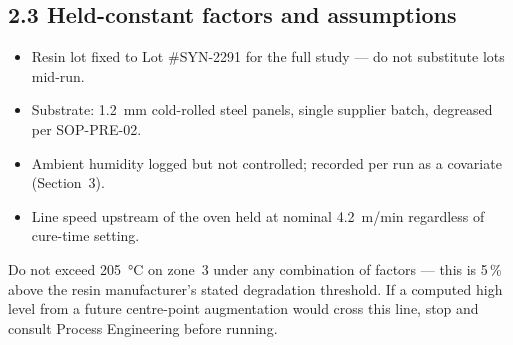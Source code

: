 \subsection*{2.3 Held-constant factors and assumptions}
\begin{itemize}
  \item Resin lot fixed to Lot \#SYN-2291 for the full study --- do not substitute lots mid-run.
  \item Substrate: 1.2~mm cold-rolled steel panels, single supplier batch, degreased per SOP-PRE-02.
  \item Ambient humidity logged but not controlled; recorded per run as a covariate (Section~3).
  \item Line speed upstream of the oven held at nominal 4.2~m/min regardless of cure-time setting.
\end{itemize}

\begin{warnbox}
Do not exceed \SI{205}{\celsius} on zone~3 under any combination of factors --- this is 5\,\%
above the resin manufacturer's stated degradation threshold. If a computed high level from a
future centre-point augmentation would cross this line, stop and consult Process Engineering
before running.
\end{warnbox}
